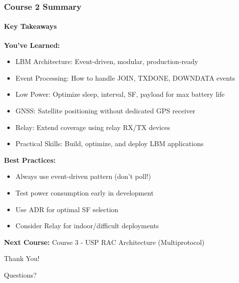 \documentclass{beamer}
\begin{document}
\begin{frame}
\frametitle{Course 2 Summary}
\framesubtitle{Key Takeaways}

\textbf{You've Learned:}
\begin{itemize}
    \item LBM Architecture: Event-driven, modular, production-ready
    \item Event Processing: How to handle JOIN, TXDONE, DOWNDATA events
    \item Low Power: Optimize sleep, interval, SF, payload for max battery life
    \item GNSS: Satellite positioning without dedicated GPS receiver
    \item Relay: Extend coverage using relay RX/TX devices
    \item Practical Skills: Build, optimize, and deploy LBM applications
\end{itemize}

\vspace{1em}

\textbf{Best Practices:}
\begin{itemize}
    \item Always use event-driven pattern (don't poll!)
    \item Test power consumption early in development
    \item Use ADR for optimal SF selection
    \item Consider Relay for indoor/difficult deployments
\end{itemize}

\vspace{1em}

\textbf{Next Course:} Course 3 - USP RAC Architecture (Multiprotocol)
\end{frame}

\begin{frame}[plain]
\centering
\Huge Thank You!

\vspace{2em}

\large Questions?

\vspace{2em}

\normalsize

\end{frame}
\end{document}

